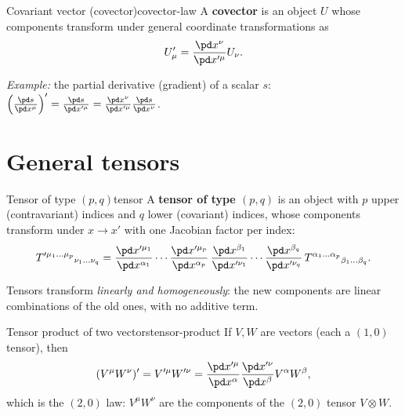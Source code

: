 \begin{definition}{Covariant vector (covector)}{covector-law}
A \textbf{covector} is an object $U$ whose components transform under general coordinate transformations as
\begin{equation}
  U'_\mu=\frac{\pd x^\nu}{\pd x'^\mu}U_\nu .
\end{equation}
\end{definition}
\textit{Example:} the partial derivative (gradient) of a scalar $s$: $\left(\frac{\pd s}{\pd x^\mu}\right)'=\frac{\pd s}{\pd x'^\mu}=\frac{\pd x^\nu}{\pd x'^\mu}\frac{\pd s}{\pd x^\nu}$.

\section{General tensors}

\begin{definition}{Tensor of type $(p,q)$}{tensor}
A \textbf{tensor of type $(p,q)$} is an object with $p$ upper (contravariant) indices and $q$ lower (covariant) indices, whose components transform under $x\to x'$ with one Jacobian factor per index:
\begin{equation}
  T'^{\mu_1\dots\mu_p}{}_{\nu_1\dots\nu_q}=
  \frac{\pd x'^{\mu_1}}{\pd x^{\alpha_1}}\cdots\frac{\pd x'^{\mu_p}}{\pd x^{\alpha_p}}\,
  \frac{\pd x^{\beta_1}}{\pd x'^{\nu_1}}\cdots\frac{\pd x^{\beta_q}}{\pd x'^{\nu_q}}\,
  T^{\alpha_1\dots\alpha_p}{}_{\beta_1\dots\beta_q}.
  \label{eq:tensor-law}
\end{equation}
\end{definition}
Tensors transform \emph{linearly and homogeneously}: the new components are linear combinations of the old ones, with no additive term.

\begin{example}{Tensor product of two vectors}{tensor-product}
If $V,W$ are vectors (each a $(1,0)$ tensor), then
\[
  (V^\mu W^\nu)'=V'^\mu W'^\nu=\frac{\pd x'^\mu}{\pd x^\alpha}\frac{\pd x'^\nu}{\pd x^\beta}V^\alpha W^\beta ,
\]
which is the $(2,0)$ law: $V^\mu W^\nu$ are the components of the $(2,0)$ tensor $V\otimes W$.
\end{example}

